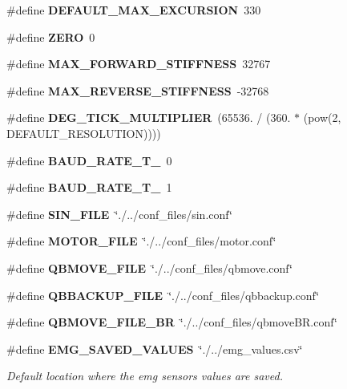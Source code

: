 \begin{DoxyCompactItemize}
\item 
\mbox{\label{definitions_8h_a92f641bf6a2b5f3e0277d62d29158bff}} 
\#define {\bfseries D\+E\+F\+A\+U\+L\+T\+\_\+\+M\+A\+X\+\_\+\+E\+X\+C\+U\+R\+S\+I\+ON}~330
\item 
\mbox{\label{definitions_8h_ac328e551bde3d39b6d7b8cc9e048d941}} 
\#define {\bfseries Z\+E\+RO}~0
\item 
\mbox{\label{definitions_8h_a2719be2b85fcfd6fd26291a9a7775ea7}} 
\#define {\bfseries M\+A\+X\+\_\+\+F\+O\+R\+W\+A\+R\+D\+\_\+\+S\+T\+I\+F\+F\+N\+E\+SS}~32767
\item 
\mbox{\label{definitions_8h_ad91fa28a852c573709249b16fca30d23}} 
\#define {\bfseries M\+A\+X\+\_\+\+R\+E\+V\+E\+R\+S\+E\+\_\+\+S\+T\+I\+F\+F\+N\+E\+SS}~-\/32768
\item 
\mbox{\label{definitions_8h_adc098850cdde5fbe8e5f4fe910f9ce27}} 
\#define {\bfseries D\+E\+G\+\_\+\+T\+I\+C\+K\+\_\+\+M\+U\+L\+T\+I\+P\+L\+I\+ER}~(65536. / (360. $\ast$ (pow(2, D\+E\+F\+A\+U\+L\+T\+\_\+\+R\+E\+S\+O\+L\+U\+T\+I\+ON))))
\item 
\mbox{\label{definitions_8h_a44483e681594d0e510fd59c2b4b09ed9}} 
\#define {\bfseries B\+A\+U\+D\+\_\+\+R\+A\+T\+E\+\_\+\+T\+\_}~0
\item 
\mbox{\label{definitions_8h_ad2c3e3edb0886633d686996e2f8c48e6}} 
\#define {\bfseries B\+A\+U\+D\+\_\+\+R\+A\+T\+E\+\_\+\+T\+\_}~1
\item 
\mbox{\label{definitions_8h_a342ce09900d5e0dc2b6adb9afe5f1778}} 
\#define {\bfseries S\+I\+N\+\_\+\+F\+I\+LE}~\char`\"{}./../conf\+\_\+files/sin.\+conf\char`\"{}
\item 
\mbox{\label{definitions_8h_aaf3958c9ffdb0121b3ae603509e15d44}} 
\#define {\bfseries M\+O\+T\+O\+R\+\_\+\+F\+I\+LE}~\char`\"{}./../conf\+\_\+files/motor.\+conf\char`\"{}
\item 
\mbox{\label{definitions_8h_a85af9928ee1b7b3029d40a0058e617de}} 
\#define {\bfseries Q\+B\+M\+O\+V\+E\+\_\+\+F\+I\+LE}~\char`\"{}./../conf\+\_\+files/qbmove.\+conf\char`\"{}
\item 
\mbox{\label{definitions_8h_ad0c21fc604bc4dae8a306f330762b8b5}} 
\#define {\bfseries Q\+B\+B\+A\+C\+K\+U\+P\+\_\+\+F\+I\+LE}~\char`\"{}./../conf\+\_\+files/qbbackup.\+conf\char`\"{}
\item 
\mbox{\label{definitions_8h_a73d175f1cc3a063336277351cf7feb42}} 
\#define {\bfseries Q\+B\+M\+O\+V\+E\+\_\+\+F\+I\+L\+E\+\_\+\+BR}~\char`\"{}./../conf\+\_\+files/qbmove\+B\+R.\+conf\char`\"{}
\item 
\mbox{\label{definitions_8h_ab1563f614ecc2b82f97cd65b88217bd9}} 
\#define \textbf{ E\+M\+G\+\_\+\+S\+A\+V\+E\+D\+\_\+\+V\+A\+L\+U\+ES}~\char`\"{}./../emg\+\_\+values.\+csv\char`\"{}
\begin{DoxyCompactList}\small\item\em Default location where the emg sensors values are saved. \end{DoxyCompactList}\end{DoxyCompactItemize}


